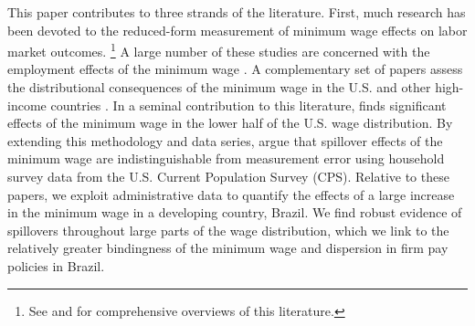 This paper contributes to three strands of the literature. First, much research has been devoted to the reduced-form measurement of minimum wage effects on labor market outcomes.%
%
\footnote{See \citet{Card1995} and \citet{NeumarkWascher2008} for comprehensive overviews of this literature.} %
%
A large number of these studies are concerned with the employment effects of the minimum wage \citep[e.g.,][]{CardKrueger1994}. A complementary set of papers assess the distributional consequences of the minimum wage in the U.S. and other high-income countries \citep{Grossman1983, DiNardo1996, Machin2003, Teulings2003, ButcherDickensManning2012, FortinLemieux2015, Brochuetal2018, FirpoFortinLemieux2018, RinzVoorheis2018, CengizDubeLindnerZipperer2019, FortinLemieuxLloyd2021}. In a seminal contribution to this literature, \citet{Lee1999} finds significant effects of the minimum wage in the lower half of the U.S. wage distribution. By extending this methodology and data series, \citet{Autor2016} argue that spillover effects of the minimum wage are indistinguishable from measurement error using household survey data from the U.S. Current Population Survey (CPS). Relative to these papers, we exploit administrative data to quantify the effects of a large increase in the minimum wage in a developing country, Brazil. We find robust evidence of spillovers throughout large parts of the wage distribution, which we link to the relatively greater bindingness of the minimum wage and dispersion in firm pay policies in Brazil.

